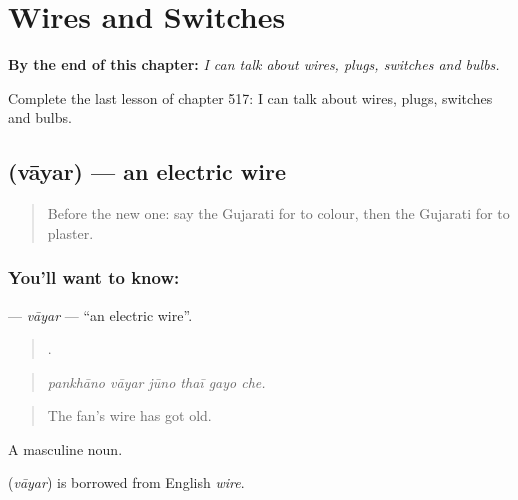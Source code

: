
\chapter{Wires and Switches}
\label{ch:gu-wires-and-switches}

\begin{chapteropening}
\textbf{By the end of this chapter:} \emph{I can talk about wires, plugs, switches and bulbs.}

Complete the last lesson of chapter 517: I can talk about wires, plugs, switches and bulbs.
\end{chapteropening}

\section[\texorpdfstring{\gu{વાયર} (vāyar)}{વાયર (vāyar)}]{ (vāyar) — an electric wire}

\label{lesson:GU-C517-vayar}



\begin{quote}
Before the new one: say the Gujarati for to colour, then the Gujarati for to plaster.
\end{quote}

\subsection*{You'll want to know: }
\textbf{} — \emph{vāyar} — \textquotedblleft{}an electric wire\textquotedblright{}.

\begin{quote}
     .
\end{quote}

\begin{quote}
\emph{pankhāno vāyar jūno thaī gayo che.}
\end{quote}

\begin{quote}
The fan's wire has got old.
\end{quote}

A masculine noun.

\begin{cousinweb}
\textbf{} (\emph{vāyar}) is borrowed from English \emph{wire}.
\end{cousinweb}

